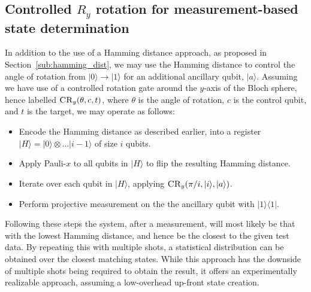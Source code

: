 \begin{appendices}
\section{Controlled $R_y$ rotation for measurement-based state determination}\label{app:ry_phase}
In addition to the use of a Hamming distance approach, as proposed in Section~\ref{sub:hamming_dist}, we may use the Hamming distance to control the angle of rotation from $|0\rangle\rightarrow\vert 1\rangle$ for an additional ancillary qubit, $\vert a \rangle$. Assuming we have use of a controlled rotation gate around the $y$-axis of the Bloch sphere, hence labelled $\textsc{CR}_y(\theta,c,t)$, where $\theta$ is the angle of rotation, $c$ is the control qubit, and $t$ is the target, we may operate as follows:
\begin{itemize}
    \item Encode the Hamming distance as described earlier, into a register $\vert H\rangle = \vert 0\rangle\otimes\dots\vert i-1\rangle$ of size $i$ qubits.
    \item Apply Pauli-$x$ to all qubits in $\vert H \rangle$ to flip the resulting Hamming distance.
    \item Iterate over each qubit in $\vert H\rangle$, applying $\textsc{CR}_y(\pi/i, \vert i \rangle, \vert a\rangle)$.
    \item Perform projective measurement on the the ancillary qubit with $\vert 1\rangle\langle 1 \vert$.
\end{itemize}
Following these steps the system, after a measurement, will most likely be that with the lowest Hamming distance, and hence be the closest to the given test data. By repeating this with multiple shots, a statistical distribution can be obtained over the closest matching states.
While this approach has the downside of multiple shots being required to obtain the result, it offers an experimentally realizable approach, assuming a low-overhead up-front state creation.

\end{appendices}


